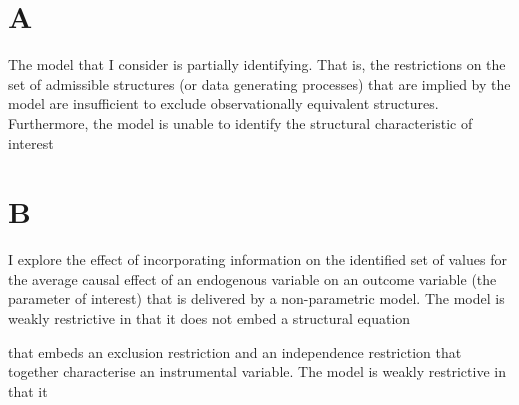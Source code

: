 \documentclass[10pt,a4paper,twoside]{article}
\numberwithin{equation}{subsection}
\begin{document}
\section{A}
The model that I consider is partially identifying. That is, the restrictions on the set of admissible structures (or data generating processes) that are implied by the model are insufficient to exclude observationally equivalent structures. Furthermore, the model is unable to identify the structural characteristic of interest 

\section{B}
I explore the effect of incorporating information on the identified set of values for the average causal effect of an endogenous variable on an outcome variable (the parameter of interest) that is delivered by a non-parametric model. The model is weakly restrictive in that it does not embed a structural equation 


 that embeds an exclusion restriction and an independence restriction that together characterise an instrumental variable. The model is weakly restrictive in that it 
 
\end{document}
